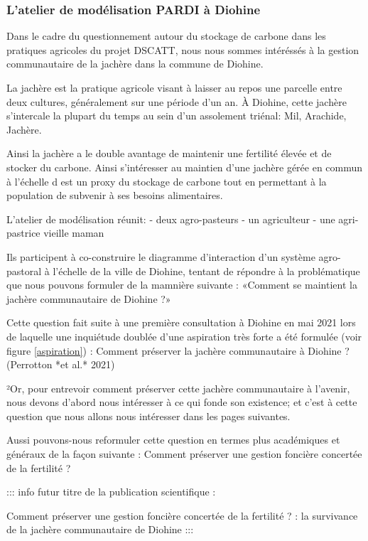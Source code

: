 \subsubsection{L'atelier de modélisation PARDI à Diohine }

Dans le cadre du questionnement autour du stockage de carbone dans les pratiques agricoles du projet DSCATT, nous nous sommes intéréssés à la gestion communautaire de la jachère dans la commune de Diohine. 

La jachère est la pratique agricole visant à laisser au repos une parcelle entre deux cultures, généralement sur une période d'un an. À Diohine, cette jachère s'intercale la plupart du temps au sein d'un assolement triénal: Mil, Arachide, Jachère.

Ainsi la jachère a le double avantage de maintenir une fertilité élevée et de stocker du carbone. Ainsi s'intéresser au maintien d'une jachère gérée en commun à l'échelle d est un proxy du stockage de carbone tout en permettant à la population de subvenir à ses besoins alimentaires.

L'atelier de modélisation réunit:
- deux agro-pasteurs
- un agriculteur
- une agri-pastrice vieille maman 

Ils participent à co-construire le diagramme d'interaction d'un système agro-pastoral à l'échelle de la ville de Diohine, tentant de répondre à la problématique que nous pouvons formuler de la mamnière suivante : «Comment se maintient la jachère communautaire de Diohine ?»

Cette question fait suite à une première consultation à Diohine en mai 2021 lors de laquelle une inquiétude doublée d'une aspiration très forte a été formulée (voir figure \ref{aspiration}) : Comment préserver la jachère communautaire à Diohine ? (Perrotton *et al.* 2021) 

²Or, pour entrevoir comment préserver cette jachère communautaire à l'avenir, nous devons d'abord nous intéresser à ce qui fonde son existence; et c'est à cette question que nous allons nous intéresser dans les pages suivantes. 


Aussi pouvons-nous reformuler cette question en termes plus académiques et généraux de la façon suivante :  
Comment préserver une gestion foncière concertée de la fertilité ?

::: info
futur titre de la publication scientifique : 

Comment préserver une gestion foncière concertée de la fertilité ? : la survivance de la jachère communautaire de Diohine
:::


